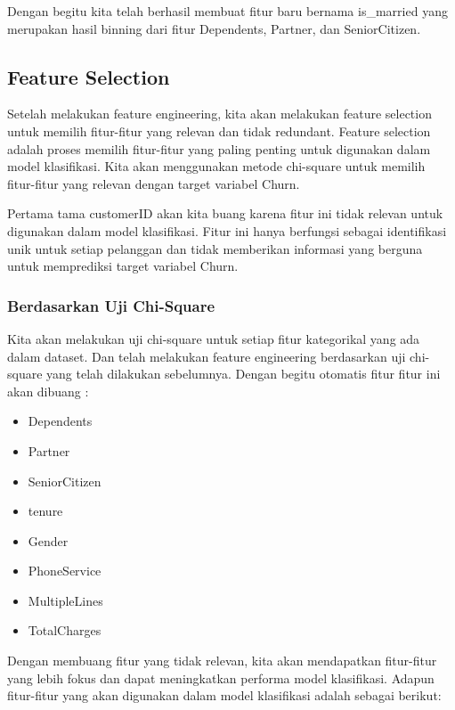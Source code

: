 Dengan begitu kita telah berhasil membuat fitur baru bernama is\_married yang merupakan hasil binning dari fitur Dependents, Partner, dan SeniorCitizen.

\subsection{Feature Selection}
Setelah melakukan feature engineering, kita akan melakukan feature selection untuk memilih fitur-fitur yang relevan dan tidak redundant. Feature selection adalah proses memilih fitur-fitur yang paling penting untuk digunakan dalam model klasifikasi. Kita akan menggunakan metode chi-square untuk memilih fitur-fitur yang relevan dengan target variabel Churn.

Pertama tama customerID akan kita buang karena fitur ini tidak relevan untuk digunakan dalam model klasifikasi. Fitur ini hanya berfungsi sebagai identifikasi unik untuk setiap pelanggan dan tidak memberikan informasi yang berguna untuk memprediksi target variabel Churn.

\subsubsection{Berdasarkan Uji Chi-Square}
Kita akan melakukan uji chi-square untuk setiap fitur kategorikal yang ada dalam dataset. Dan telah melakukan feature engineering berdasarkan uji chi-square yang telah dilakukan sebelumnya. Dengan begitu otomatis fitur fitur ini akan dibuang :

\begin{itemize}
    \item Dependents
    \item Partner
    \item SeniorCitizen
    \item tenure
    \item Gender
    \item PhoneService
    \item MultipleLines
    \item TotalCharges
\end{itemize}

Dengan membuang fitur yang tidak relevan, kita akan mendapatkan fitur-fitur yang lebih fokus dan dapat meningkatkan performa model klasifikasi. Adapun fitur-fitur yang akan digunakan dalam model klasifikasi adalah sebagai berikut:

